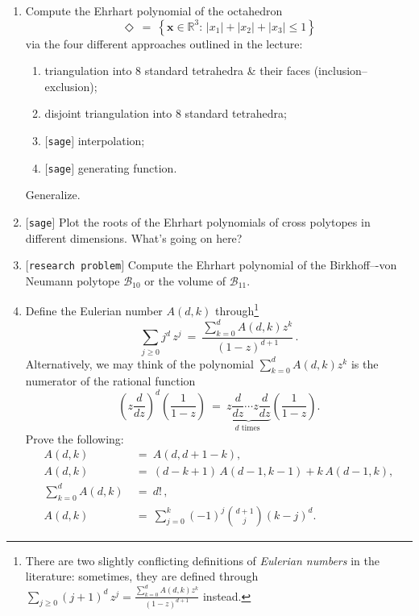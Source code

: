 \documentclass[11pt]{article}
\def\bx{\mathbf{x}}
\def\cB{\mathcal{B}}
\def\RR{\mathbb{R}}
\def\open{$[${\tt research problem}$]$ }
\def\sage{$[${\tt sage}$]$ }
\begin{document}
\begin{enumerate}[(1)]
\item Compute the Ehrhart polynomial of the octahedron
\[
  \Diamond \ = \ \left\{ \bx \in \RR^3 : \, \left| x_1 \right| + \left| x_2 \right| + \left| x_3 \right| \leq 1 \right\}
\]
via the four different approaches outlined in the lecture:
\begin{enumerate}
  \item triangulation into 8 standard tetrahedra \& their faces
(inclusion--exclusion);
  \item disjoint triangulation into 8 standard tetrahedra;
  \item \sage interpolation;
  \item \sage generating function.
\end{enumerate}
Generalize.

\item \sage Plot the roots of the Ehrhart polynomials of cross polytopes in
different dimensions. What's going on here?

\item \open Compute the Ehrhart polynomial of the Birkhoff–-von Neumann polytope $\cB_{ 10 }$ or the
volume of $\cB_{ 11 }$. 

\newcommand\eulerco[2]{A \left( #1, #2 \right)} 
\item 
Define the Eulerian number
$\eulerco d k$ through\footnote{There are two slightly conflicting definitions of \emph{Eulerian numbers} in the literature: sometimes, they are defined through
$\sum_{ j \ge 0 } (j+1)^d \, z^j = \frac{ \sum_{ k=0 }^{ d } \eulerco d k z^{k}
}{ (1-z)^{ d+1 } }$ instead.}
\begin{equation*}
 \sum_{ j \ge 0 } j^d \, z^j \ = \ \frac{ \sum_{ k=0 }^{ d } \eulerco d k z^{k} }{ (1-z)^{ d+1 } } \, .
\end{equation*}
Alternatively, we may think of the polynomial $ \sum_{ k=0 }^{ d } \eulerco d k z^{k} $ is the numerator of the rational function
\[
 \left( z \frac{ d }{ dz } \right)^d \left( \frac{ 1 }{ 1-z } \right) \ = \ \underbrace{ z \frac{ d }{ dz } \cdots z \frac{ d }{ dz } }_{ d \text{ times } } \left( \frac{ 1 }{ 1-z } \right) .
\]
Prove the following:
\begin{align*}
\eulerco d k \ &= \ \eulerco d {d+1-k} ,  \\
\eulerco{ d }{ k } \ &= \ (d-k+1) \, \eulerco{ d-1 }{ k-1 } + k \, \eulerco{ d-1}{ k } , \\
\sum_{ k=0 }^{ d } \eulerco d k \ &= \ d! \, , \\
\eulerco d k \ &= \ \sum_{ j=0 }^{ k } (-1)^j \binom{ d+1 }{ j } (k-j)^d . 
\end{align*}


\end{enumerate}
\end{document}
